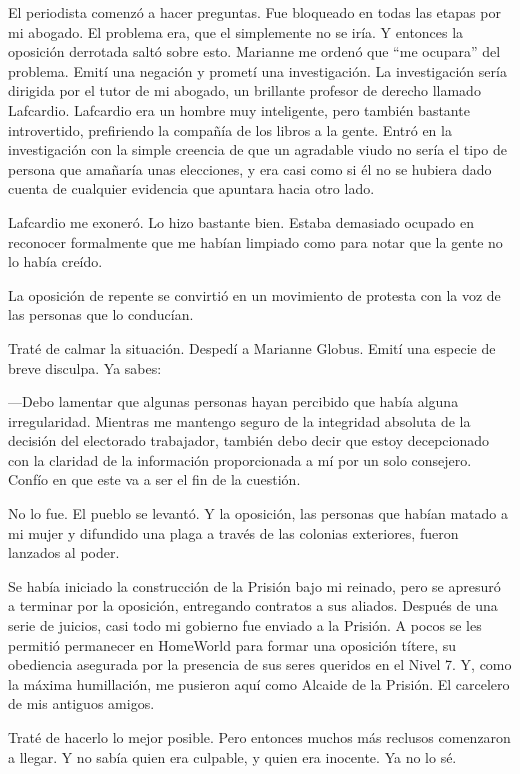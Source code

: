 El periodista comenzó a hacer preguntas. Fue bloqueado en todas las
etapas por mi abogado. El problema era, que el simplemente no se iría. Y
entonces la oposición derrotada saltó sobre esto. Marianne me ordenó que
``me ocupara'' del problema. Emití una negación y prometí una
investigación. La investigación sería dirigida por el tutor de mi
abogado, un brillante profesor de derecho llamado Lafcardio. Lafcardio
era un hombre muy inteligente, pero también bastante introvertido,
prefiriendo la compañía de los libros a la gente. Entró en la
investigación con la simple creencia de que un agradable viudo no sería
el tipo de persona que amañaría unas elecciones, y era casi como si él
no se hubiera dado cuenta de cualquier evidencia que apuntara hacia otro
lado.

Lafcardio me exoneró. Lo hizo bastante bien. Estaba demasiado ocupado en
reconocer formalmente que me habían limpiado como para notar que la
gente no lo había creído.

La oposición de repente se convirtió en un movimiento de protesta con la
voz de las personas que lo conducían.

Traté de calmar la situación. Despedí a Marianne Globus. Emití una
especie de breve disculpa. Ya sabes:~

---Debo lamentar que algunas personas hayan percibido que había alguna
irregularidad. Mientras me mantengo seguro de la integridad absoluta de
la decisión del electorado trabajador, también debo decir que estoy
decepcionado con la claridad de la información proporcionada a mí por un
solo consejero. Confío en que este va a ser el fin de la cuestión.

No lo fue. El pueblo se levantó. Y la oposición, las personas que habían
matado a mi mujer y difundido una plaga a través de las colonias
exteriores, fueron lanzados al poder.

Se había iniciado la construcción de la Prisión bajo mi reinado, pero se
apresuró a terminar por la oposición, entregando contratos a sus
aliados. Después de una serie de juicios, casi todo mi gobierno fue
enviado a la Prisión. A pocos se les permitió permanecer en HomeWorld
para formar una oposición títere, su obediencia asegurada por la
presencia de sus seres queridos en el Nivel 7. Y, como la máxima
humillación, me pusieron aquí como Alcaide de la Prisión. El carcelero
de mis antiguos amigos.

Traté de hacerlo lo mejor posible. Pero entonces muchos más reclusos
comenzaron a llegar. Y no sabía quien era culpable, y quien era
inocente. Ya no lo sé.

